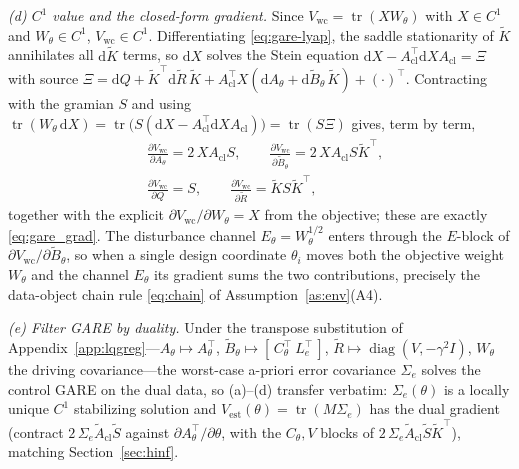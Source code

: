 \documentclass[twocolumn,amsthm]{autart}
\begin{document}
\emph{(d) $C^1$ value and the closed-form gradient.} Since
$V_{\mathrm{wc}}=\operatorname{tr}(XW_\theta)$ with $X\in C^1$ and $W_\theta\in
C^1$, $V_{\mathrm{wc}}\in C^1$. Differentiating \eqref{eq:gare-lyap}, the saddle
stationarity of $\tilde K$ annihilates all $\mathrm d\tilde K$ terms, so
$\mathrm dX$ solves the Stein equation $\mathrm
dX-A_{\mathrm{cl}}^\top\mathrm dX A_{\mathrm{cl}}=\Xi$ with source
$\Xi=\mathrm dQ+\tilde K^\top\mathrm d\tilde R\,\tilde K+
A_{\mathrm{cl}}^\top X(\mathrm dA_\theta+\mathrm d\tilde B_\theta\,\tilde K)
+(\cdot)^\top$. Contracting with the gramian $S$ and using
$\operatorname{tr}(W_\theta\,\mathrm dX)=\operatorname{tr}\!\big(S(\mathrm
dX-A_{\mathrm{cl}}^\top\mathrm dX A_{\mathrm{cl}})\big)=\operatorname{tr}(S\Xi)$
gives, term by term,
\begin{equation}\label{eq:gare-grad-app}
\begin{aligned}
&\frac{\partial V_{\mathrm{wc}}}{\partial A_\theta}=2\,XA_{\mathrm{cl}}S,\qquad
\frac{\partial V_{\mathrm{wc}}}{\partial \tilde B_\theta}=2\,XA_{\mathrm{cl}}S\tilde K^\top,\\
&\frac{\partial V_{\mathrm{wc}}}{\partial Q}=S,\qquad
\frac{\partial V_{\mathrm{wc}}}{\partial \tilde R}=\tilde KS\tilde K^\top,
\end{aligned}
\end{equation}
together with the explicit $\partial V_{\mathrm{wc}}/\partial W_\theta=X$ from the
objective; these are exactly \eqref{eq:gare_grad}. The disturbance channel
$E_\theta=W_\theta^{1/2}$ enters through the $E$-block of
$\partial V_{\mathrm{wc}}/\partial\tilde B_\theta$, so when a single design
coordinate $\theta_i$ moves both the objective weight $W_\theta$ and the channel
$E_\theta$ its gradient sums the two contributions, precisely the data-object
chain rule \eqref{eq:chain} of Assumption~\ref{as:env}(A4).

\emph{(e) Filter GARE by duality.} Under the transpose substitution of
Appendix~\ref{app:lqgreg}---$A_\theta\!\mapsto\!A_\theta^\top$, $\tilde
B_\theta\!\mapsto\![\,C_\theta^\top\ L_e^\top\,]$, $\tilde
R\!\mapsto\!\operatorname{diag}(V,-\gamma^2 I)$, $W_\theta$ the driving
covariance---the worst-case a-priori error covariance $\Sigma_e$ solves the
control GARE on the dual data, so (a)--(d) transfer verbatim: $\Sigma_e(\theta)$
is a locally unique $C^1$ stabilizing solution and
$V_{\mathrm{est}}(\theta)=\operatorname{tr}(M\Sigma_e)$ has the dual gradient
(contract $2\,\Sigma_e\tilde A_{\mathrm{cl}}\tilde S$ against
$\partial A_\theta^\top/\partial\theta$, with the $C_\theta,V$ blocks of
$2\,\Sigma_e\tilde A_{\mathrm{cl}}\tilde S\tilde K^\top$), matching
Section~\ref{sec:hinf}.
\end{document}
